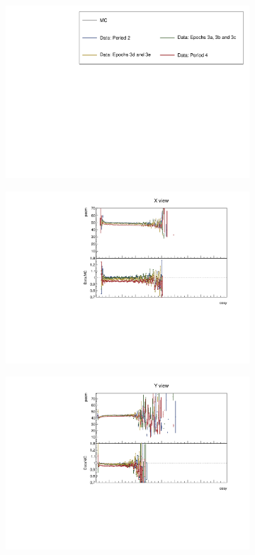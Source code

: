 \documentclass[12pt,a4paper]{article}
\begin{document}
\begin{figure}[h!]
  \begin{subfigure}{\textwidth}
  \centering
    \includegraphics[height=0.2\linewidth]{essentialsec_tb/legend.pdf}
  \end{subfigure}
  \vspace*{2mm}
  
  \begin{subfigure}{0.5\textwidth}
    \includegraphics[width=\linewidth]{PlotsAngularDistribution/pecm_cosy_x.pdf}
  \end{subfigure}
  \begin{subfigure}{0.5\textwidth}
    \includegraphics[width=\linewidth]{PlotsAngularDistribution/pecm_cosy_y.pdf}

\end{subfigure}
\end{figure}
\end{document}
